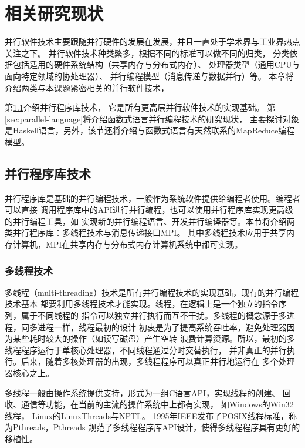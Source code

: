 \chapter{相关研究现状}
并行软件技术主要跟随并行硬件的发展在发展，并且一直处于学术界与工业界热点关注之下。
并行软件技术种类繁多，根据不同的标准可以做不同的归类，
分类依据包括适用的硬件系统结构（共享内存与分布式内存）、
处理器类型（通用CPU与面向特定领域的协处理器）、
并行编程模型（消息传递与数据并行）等。
本章将介绍两类与本课题紧密相关的并行软件技术，

第\ref{sec:parallel-library}介绍并行程序库技术，
它是所有更高层并行软件技术的实现基础。
第\ref{sec:parallel-language}将介绍函数式语言并行编程技术的研究现状，
主要探讨对象是Haskell语言，另外，该节还将介绍与函数式语言有天然联系的MapReduce编程模型。

\section{并行程序库技术}\label{sec:parallel-library}
并行程序库是基础的并行编程技术，一般作为系统软件提供给编程者使用。编程者可以直接
调用程序库中的API进行并行编程，也可以使用并行程序库实现更高级的并行编程工具，如
实现新的并行编程语言、开发并行编译器等。本节将介绍两类并行程序库：多线程技术与消息传递接口MPI。
其中多线程技术应用于共享内存计算机，MPI在共享内存与分布式内存计算机系统中都可实现。

\subsection{多线程技术}
多线程（multi-threading）技术是所有并行编程技术的实现基础，现有的并行编程技术基本
都要利用多线程技术才能实现。线程，在逻辑上是一个独立的指令序列，属于不同线程的
指令可以独立并行执行而互不干扰。多线程的概念源于多进程，同多进程一样，线程最初的设计
初衷是为了提高系统吞吐率，避免处理器因为某些耗时较大的操作（如读写磁盘）产生空转
浪费计算资源。所以，最初的多线程程序运行于单核心处理器，不同线程通过分时交替执行，
并非真正的并行执行。后来，随着多核处理器的出现，多线程程序可以真正并行地运行在
多个处理器核心之上。

多线程一般由操作系统提供支持，形式为一组C语言API，实现线程的创建、
回收、通信等功能，在当前的主流的操作系统中上都有实现，
如Windows的Win32线程，
Linux的LinuxThreads与NPTL。
1995年IEEE发布了POSIX线程标准，称为Pthreads，Pthreads
规范了多线程程序库API设计，使得多线程程序具有更好的移植性。

